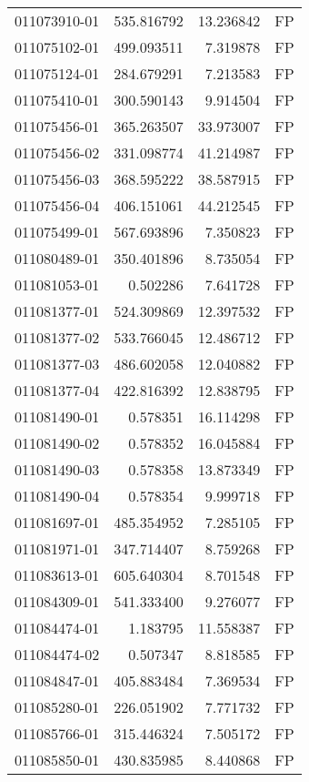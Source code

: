 \begin{tabular}{lrrl}
011073910-01 &  535.816792 &    13.236842 &   FP \\
011075102-01 &  499.093511 &     7.319878 &   FP \\
011075124-01 &  284.679291 &     7.213583 &   FP \\
011075410-01 &  300.590143 &     9.914504 &   FP \\
011075456-01 &  365.263507 &    33.973007 &   FP \\
011075456-02 &  331.098774 &    41.214987 &   FP \\
011075456-03 &  368.595222 &    38.587915 &   FP \\
011075456-04 &  406.151061 &    44.212545 &   FP \\
011075499-01 &  567.693896 &     7.350823 &   FP \\
011080489-01 &  350.401896 &     8.735054 &   FP \\
011081053-01 &    0.502286 &     7.641728 &   FP \\
011081377-01 &  524.309869 &    12.397532 &   FP \\
011081377-02 &  533.766045 &    12.486712 &   FP \\
011081377-03 &  486.602058 &    12.040882 &   FP \\
011081377-04 &  422.816392 &    12.838795 &   FP \\
011081490-01 &    0.578351 &    16.114298 &   FP \\
011081490-02 &    0.578352 &    16.045884 &   FP \\
011081490-03 &    0.578358 &    13.873349 &   FP \\
011081490-04 &    0.578354 &     9.999718 &   FP \\
011081697-01 &  485.354952 &     7.285105 &   FP \\
011081971-01 &  347.714407 &     8.759268 &   FP \\
011083613-01 &  605.640304 &     8.701548 &   FP \\
011084309-01 &  541.333400 &     9.276077 &   FP \\
011084474-01 &    1.183795 &    11.558387 &   FP \\
011084474-02 &    0.507347 &     8.818585 &   FP \\
011084847-01 &  405.883484 &     7.369534 &   FP \\
011085280-01 &  226.051902 &     7.771732 &   FP \\
011085766-01 &  315.446324 &     7.505172 &   FP \\
011085850-01 &  430.835985 &     8.440868 &   FP \\

\end{tabular}
